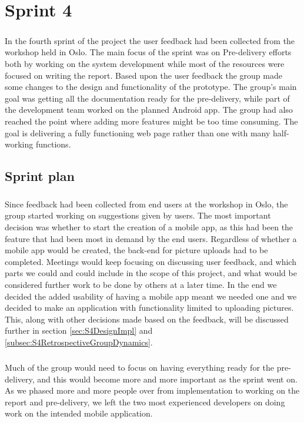 \chapter{Sprint 4}
\label{chap:S4}

\paragraph{} In the fourth sprint of the project the user feedback had been collected from the workshop held in Oslo. The main focus of the sprint was on Pre-delivery efforts both by working on the system development while most of the resources were focused on writing the report. Based upon the user feedback the group made some changes to the design and functionality of the prototype. The group's main goal was getting all the documentation ready for the pre-delivery, while part of the development team worked on the planned Android app. The group had also reached the point where adding more features might be too time consuming. The goal is delivering a fully functioning web page rather than one with many half-working functions.

\section{Sprint plan}
\label{sec:S4Plan}

\paragraph{} Since feedback had been collected from end users at the workshop in Oslo, the group started working on suggestions given by users. The most important decision was whether to start the creation of a mobile app, as this had been the feature that had been most in demand by the end users. Regardless of whether a mobile app would be created, the back-end for picture uploads had to be completed. Meetings would keep focusing on discussing user feedback, and which parts we could and could include in the scope of this project, and what would be considered further work to be done by others at a later time. In the end we decided the added usability of having a mobile app meant we needed one and we decided to make an application with functionality limited to uploading pictures. This, along with other decisions made based on the feedback, will be discussed further in section \ref{sec:S4DesignImpl} and \ref{subsec:S4RetrospectiveGroupDynamics}.

\paragraph{} Much of the group would need to focus on having everything ready for the pre-delivery, and this would become more and more important as the sprint went on. As we phased more and more people over from implementation to working on the report and pre-delivery, we left the two most experienced developers on doing work on the intended mobile application.

